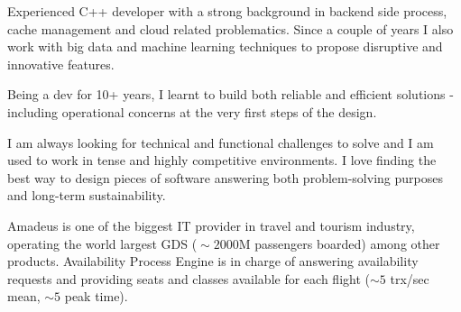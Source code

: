 \documentclass[10pt, a4paper, ragged2e]{altacv}
\begin{document}
\sloppy
{}

\begin{adjustwidth}{-5cm}{}
\makecvheader
\end{adjustwidth}

	Experienced C++ developer with a strong background in backend side process, cache management and cloud related problematics. Since a couple of years I also work with big data and machine learning techniques to propose disruptive and innovative features.

	\medskip
	Being a dev for 10+ years, I learnt to build both reliable and efficient solutions - including operational concerns at the very first steps of the design.

	\medskip
	I am always looking for technical and functional challenges to solve and I am used to work in tense and highly competitive environments. I love finding the best way to design pieces of software answering both problem-solving purposes and long-term sustainability.


\bigskip
{}
		
		Amadeus is one of the biggest IT provider in travel and tourism industry, operating the world largest GDS (${\sim}2000$M passengers boarded) among other products.
		Availability Process Engine is in charge of answering availability requests and providing seats and classes available for each flight (${\sim}5$ trx/sec mean, ${\sim}5$ peak time).
\end{document}
